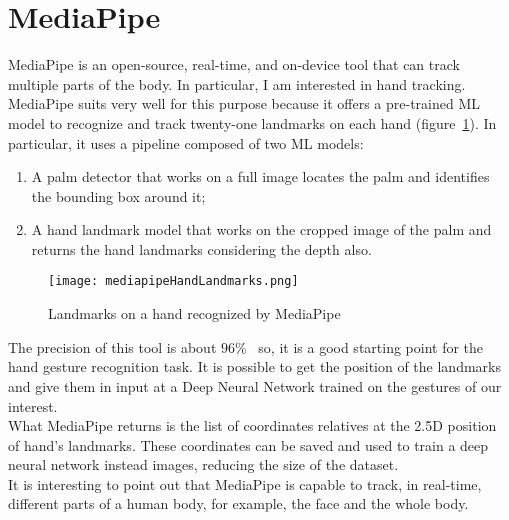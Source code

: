 \documentclass[../thesis.tex]{subfiles}
\begin{document}
\section{MediaPipe}\label{sec:mediapipe}
MediaPipe is an open-source, real-time, and on-device tool that can track multiple parts of the body. In particular, I am interested in hand tracking. MediaPipe suits very well for this purpose because it offers a pre-trained \acrshort{ML} model to recognize and track twenty-one landmarks on each hand (figure~\ref{fig:landmarksMediapipe}). In particular, it uses a pipeline composed of two \acrshort{ML} models:
\begin{enumerate}
    \item A palm detector that works on a full image locates the palm and identifies the bounding box around it;
    \item A hand landmark model that works on the cropped image of the palm and returns the hand landmarks considering the depth also. 
\end{enumerate}
\begin{figure}[H]
    \centering
    \texttt{[image: mediapipeHandLandmarks.png]}
    \caption{Landmarks on a hand recognized by MediaPipe~\cite{site:mediapipe}}
    \label{fig:landmarksMediapipe}
\end{figure}
The precision of this tool is about $96\%$~\cite{article:mediapipe} so, it is a good starting point for the hand gesture recognition task. It is possible to get the position of the landmarks and give them in input at a Deep Neural Network trained on the gestures of our interest.\\
What MediaPipe returns is the list of coordinates relatives at the 2.5D position of hand's landmarks. These coordinates can be saved and used to train a deep neural network instead images, reducing the size of the dataset.\\
It is interesting to point out that MediaPipe is capable to track, in real-time, different parts of a human body, for example, the face and the whole body.~\cite{site:mediapipe}
\end{document}
